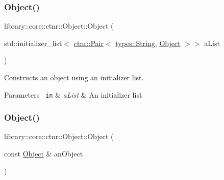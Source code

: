 \subsubsection{\texorpdfstring{Object()}{Object()}\hspace{0.1cm}{\footnotesize\ttfamily [2/3]}}
{\footnotesize\ttfamily library\+::core\+::ctnr\+::\+Object\+::\+Object (\begin{DoxyParamCaption}\item[{std\+::initializer\+\_\+list$<$ \mbox{\hyperlink{namespacelibrary_1_1core_1_1ctnr_aad6f8de4c0f279c10436d59d4ace74bd}{ctnr\+::\+Pair}}$<$ \mbox{\hyperlink{classlibrary_1_1core_1_1types_1_1_string}{types\+::\+String}}, \mbox{\hyperlink{classlibrary_1_1core_1_1ctnr_1_1_object}{Object}} $>$$>$}]{a\+List }\end{DoxyParamCaption})}



Constructs an object using an initializer list. 


\begin{DoxyCode}{0}
\end{DoxyCode}



\begin{DoxyParams}[1]{Parameters}
\mbox{\texttt{ in}}  & {\em a\+List} & An initializer list \\
\hline
\end{DoxyParams}
\mbox{\label{classlibrary_1_1core_1_1ctnr_1_1_object_a90f9c4579306498a5da413ac89ac0109}} 
\subsubsection{\texorpdfstring{Object()}{Object()}\hspace{0.1cm}{\footnotesize\ttfamily [3/3]}}
{\footnotesize\ttfamily library\+::core\+::ctnr\+::\+Object\+::\+Object (\begin{DoxyParamCaption}\item[{const \mbox{\hyperlink{classlibrary_1_1core_1_1ctnr_1_1_object}{Object}} \&}]{an\+Object }\end{DoxyParamCaption})}



